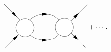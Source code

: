 \begin{equation}
\begin{gathered}
\begin{tikzpicture}[x=0.75pt,y=0.75pt,yscale=-1,xscale=1]
            \draw    (165.71,161.41) .. controls (188.71,190.79) and (225.71,187.79) .. (239.71,161.79) ;
            \draw    (211,182.2) ;
            \draw [shift={(211,182.2)}, rotate = 180] [fill={rgb, 255:red, 0; green, 0; blue, 0 }  ][line width=0.08]  [draw opacity=0] (12,-3) -- (0,0) -- (12,3) -- cycle    ;
            \draw    (165.71,151.59) .. controls (188.71,122.21) and (225.71,125.21) .. (239.71,151.21) ;
            \draw    (124.5,111.2) -- (174.71,161.41) ;
            \draw [shift={(149.6,136.3)}, rotate = 225] [fill={rgb, 255:red, 0; green, 0; blue, 0 }  ][line width=0.08]  [draw opacity=0] (12,-3) -- (0,0) -- (12,3) -- cycle    ;
            \draw    (126.71,197.41) -- (177.71,146.41) ;
            \draw [shift={(152.21,171.91)}, rotate = 495] [fill={rgb, 255:red, 0; green, 0; blue, 0 }  ][line width=0.08]  [draw opacity=0] (12,-3) -- (0,0) -- (12,3) -- cycle    ;
            \draw  [fill={rgb, 255:red, 255; green, 255; blue, 255 }  ,fill opacity=1 ] (148,157.59) .. controls (148,147.73) and (155.99,139.73) .. (165.85,139.73) .. controls (175.71,139.73) and (183.71,147.73) .. (183.71,157.59) .. controls (183.71,167.45) and (175.71,175.44) .. (165.85,175.44) .. controls (155.99,175.44) and (148,167.45) .. (148,157.59) -- cycle ;
            \draw    (257.71,168.2) -- (285.71,196.2) ;
            \draw [shift={(271.71,182.2)}, rotate = 225] [fill={rgb, 255:red, 0; green, 0; blue, 0 }  ][line width=0.08]  [draw opacity=0] (12,-3) -- (0,0) -- (12,3) -- cycle    ;
            \draw    (255.71,145.41) -- (288.91,112.2) ;
            \draw [shift={(272.31,128.8)}, rotate = 495] [fill={rgb, 255:red, 0; green, 0; blue, 0 }  ][line width=0.08]  [draw opacity=0] (12,-3) -- (0,0) -- (12,3) -- cycle    ;
            \draw  [fill={rgb, 255:red, 255; green, 255; blue, 255 }  ,fill opacity=1 ] (226,156.59) .. controls (226,146.73) and (233.99,138.73) .. (243.85,138.73) .. controls (253.71,138.73) and (261.71,146.73) .. (261.71,156.59) .. controls (261.71,166.45) and (253.71,174.44) .. (243.85,174.44) .. controls (233.99,174.44) and (226,166.45) .. (226,156.59) -- cycle ;
            \draw    (212,131) ;
            \draw [shift={(212,131)}, rotate = 180] [fill={rgb, 255:red, 0; green, 0; blue, 0 }  ][line width=0.08]  [draw opacity=0] (12,-3) -- (0,0) -- (12,3) -- cycle    ;
            \end{tikzpicture}            
    \end{gathered} + \cdots,
\end{equation}